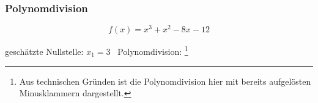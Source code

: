\subsubsection{Polynomdivision}

\[
	f(x) = x^3 + x^2 -8x - 12
\]

geschätzte Nullstelle: \(x_1 = 3\) \textrightarrow\ Polynomdivision:
\footnote{Aus technischen Gründen ist die Polynomdivision hier mit bereits aufgelösten Minusklammern dargestellt.}

